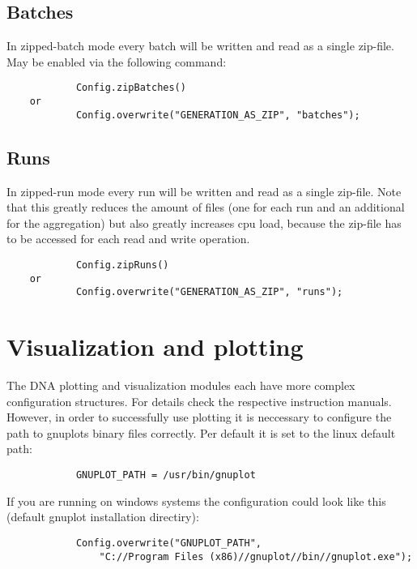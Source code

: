 \subsection{Batches}
In zipped-batch mode every batch will be written and read as a single zip-file. May be enabled via the following command:
\begin{lstlisting}
			Config.zipBatches()
	or
			Config.overwrite("GENERATION_AS_ZIP", "batches");
\end{lstlisting}

\subsection{Runs}
In zipped-run mode every run will be written and read as a single zip-file. Note that this greatly reduces the amount of files (one for each run and an additional for the aggregation) but also greatly increases cpu load, because the zip-file has to be accessed for each read and write operation.
\begin{lstlisting}
			Config.zipRuns()
	or
			Config.overwrite("GENERATION_AS_ZIP", "runs");
\end{lstlisting}

\section{Visualization and plotting}
The DNA plotting and visualization modules each have more complex configuration structures. For details check the respective instruction manuals. However, in order to successfully use plotting it is neccessary to configure the path to gnuplots binary files correctly. Per default it is set to the linux default path:
\begin{lstlisting}
			GNUPLOT_PATH = /usr/bin/gnuplot
\end{lstlisting}
If you are running on windows systems the configuration could look like this (default gnuplot installation directiry):
\begin{lstlisting}
			Config.overwrite("GNUPLOT_PATH",
				"C://Program Files (x86)//gnuplot//bin//gnuplot.exe");	
\end{lstlisting}
